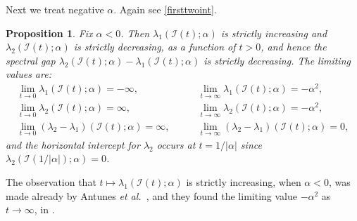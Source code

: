 \documentclass[12pt,reqno]{amsart}
\newtheorem{proposition}[proposition]{Proposition}
\theoremstyle{definition}
\begin{document}
Next we treat negative $\alpha$. Again see \autoref{firsttwoint}.
%
\begin{proposition}\label{1dimneg}
Fix $\alpha<0$. Then $\lambda_1(\mathcal{I}(t);\alpha)$ is strictly increasing and $\lambda_2(\mathcal{I}(t);\alpha)$ is strictly decreasing, as a function of $t>0$, and hence the spectral gap $\lambda_2(\mathcal{I}(t);\alpha) - \lambda_1(\mathcal{I}(t);\alpha)$ is strictly decreasing. The limiting values are:
%
\begin{align*}
 \lim_{t \to 0} \lambda_1(\mathcal{I}(t);\alpha) = -\infty , & \qquad  \lim_{t \to \infty} \lambda_1(\mathcal{I}(t);\alpha) = -\alpha^2 , \\
  \lim_{t \to 0} \lambda_2(\mathcal{I}(t);\alpha) = \infty , & \qquad  \lim_{t \to \infty} \lambda_2(\mathcal{I}(t);\alpha) = -\alpha^2 , \\
    \lim_{t \to 0} (\lambda_2-\lambda_1)(\mathcal{I}(t);\alpha) = \infty , & \qquad  \lim_{t \to \infty} (\lambda_2-\lambda_1)(\mathcal{I}(t);\alpha) = 0 ,
\end{align*}
%
and the horizontal intercept for $\lambda_2$ occurs at $t=1/|\alpha|$ since $\lambda_2(\mathcal{I}(1/|\alpha|);\alpha) = 0$.
 \end{proposition}
%
The observation that $t \mapsto \lambda_1(\mathcal{I}(t);\alpha)$ is strictly increasing, when $\alpha < 0$, was made already by Antunes \emph{et al.}\ \cite[Proposition 2]{AFK17}, and they found the limiting value $-\alpha^2$ as $t \to \infty$, in \cite[Proposition 3]{AFK17}.
%
\end{document}

